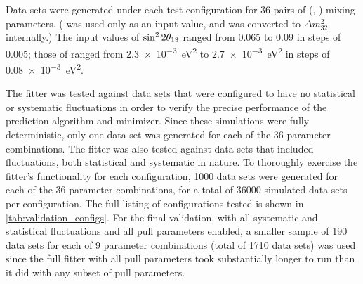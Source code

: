 Data sets were generated under each test configuration
for 36 pairs of (\thetaot{}, \dmee{}) mixing parameters.
(\dmee{} was used only as an input value,
and was converted to $\Delta m^2_{32}$ internally.)
The input values of $\sin^22\theta_{13}{}$ ranged from 0.065 to 0.09
in steps of 0.005;
those of \dmee{} ranged from
\SI{2.3e-3}{\eV\squared} to \SI{2.7e-3}{\eV\squared}
in steps of \SI{0.08e-3}{\eV\squared}.

The fitter was tested against data sets
that were configured to have no statistical or systematic fluctuations
in order to verify the precise performance
of the prediction algorithm and minimizer.
Since these simulations were fully deterministic,
only one data set was generated for each of the 36 parameter combinations.
The fitter was also tested against data sets
that included fluctuations, both statistical and systematic in nature.
To thoroughly exercise the fitter's functionality
for each configuration,
1000 data sets were generated
for each of the 36 parameter combinations,
for a total of \num{36000} simulated data sets per configuration.
The full listing of configurations tested
is shown in \cref{tab:validation_configs}.
For the final validation, with all systematic and statistical fluctuations
and all pull parameters enabled,
a smaller sample of 190 data sets for each of 9 parameter combinations
(total of \num{1710} data sets)
was used since the full fitter with all pull parameters
took substantially longer to run than it did with any subset of pull parameters.


